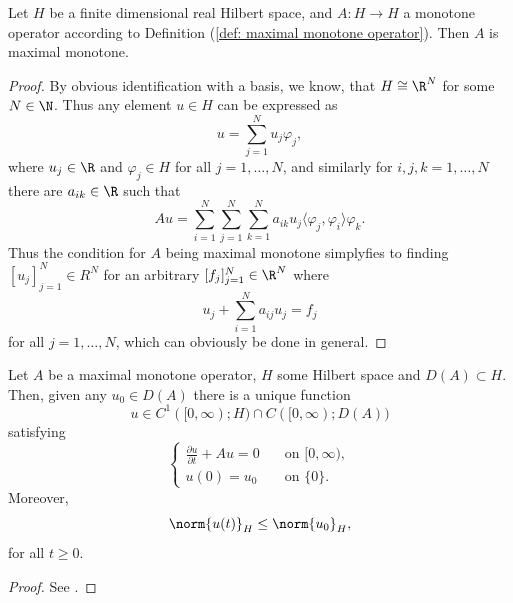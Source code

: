 \begin{lemma} \label{lemma: finite dimensional monotone operator}
    Let $H$ be a finite dimensional real Hilbert space, and $A: H \to H$ a monotone operator according to Definition
    (\ref{def: maximal monotone operator}). Then $A$ is maximal monotone.
\end{lemma}
\begin{proof}
    By obvious identification with a basis, we know, that $H \cong \R^N$ for some $N \in \N$. Thus any element 
    $u \in H$ can be expressed as 
    \begin{equation*}
        u = \sum_{j=1}^N u_j \varphi_j,
    \end{equation*}
    where $u_j \in \R$ and $\varphi_j \in H$ for all $j=1, \dots, N$, and
    similarly for $i,j, k = 1, \dots, N$ there are $a_{ik} \in \R$ such that
    \begin{equation*}
        Au = \sum_{i=1}^N \sum_{j=1}^N \sum_{k=1}^N a_{ik} u_j \langle \varphi_j, \varphi_i \rangle \varphi_k.
    \end{equation*}
    Thus the condition for $A$ being maximal monotone
    simplyfies to finding $[u_j]_{j=1}^N \in R^N$ for an arbitrary $[f_j]_{j=1}^N \in \R^N$ where
    \begin{equation*}
        u_j + \sum_{i=1}^N a_{ij} u_j = f_j
    \end{equation*} 
    for all $j=1, \dots, N$, which can obviously be done in general.
\end{proof}


\begin{theorem} \label{theo: hille-yosida}
    Let $A$ be a maximal monotone operator, $H$ some Hilbert space and $D(A) \subset H$. 
    Then, given any $u_0 \in D(A)$ there is a unique function
    \begin{equation*}
        u \in C^1([0, \infty); H) \cap C([0, \infty); D(A))
    \end{equation*}
    satisfying
    \begin{equation*}
        \begin{cases}
            \displaystyle
            \frac{\partial u}{\partial t} + Au = 0 \quad &\text{on }[0, \infty), \\
            \displaystyle
            u(0) = u_0 \quad &\text{on }\{0\}.
        \end{cases}
    \end{equation*}
    Moreover,
    \begin{equation*}
        \norm{u(t)}_H \leq \norm{u_0}_H,
    \end{equation*}
    for all $t \geq 0$.
\end{theorem}
\begin{proof}
    See \cite[p. 185-191]{brezis2011}.
\end{proof}



